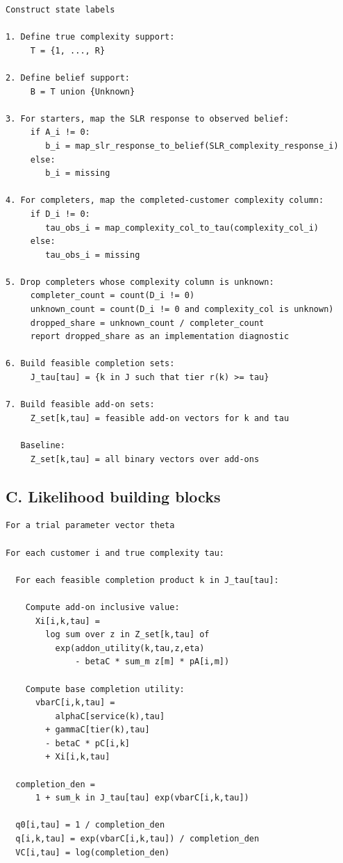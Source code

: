 \documentclass[11pt]{article}
\begin{document}
\begin{Verbatim}[fontsize=\small, frame=single]
Construct state labels

1. Define true complexity support:
     T = {1, ..., R}

2. Define belief support:
     B = T union {Unknown}

3. For starters, map the SLR response to observed belief:
     if A_i != 0:
        b_i = map_slr_response_to_belief(SLR_complexity_response_i)
     else:
        b_i = missing

4. For completers, map the completed-customer complexity column:
     if D_i != 0:
        tau_obs_i = map_complexity_col_to_tau(complexity_col_i)
     else:
        tau_obs_i = missing

5. Drop completers whose complexity column is unknown:
     completer_count = count(D_i != 0)
     unknown_count = count(D_i != 0 and complexity_col is unknown)
     dropped_share = unknown_count / completer_count
     report dropped_share as an implementation diagnostic

6. Build feasible completion sets:
     J_tau[tau] = {k in J such that tier r(k) >= tau}

7. Build feasible add-on sets:
     Z_set[k,tau] = feasible add-on vectors for k and tau

   Baseline:
     Z_set[k,tau] = all binary vectors over add-ons
\end{Verbatim}

\newpage
\subsection*{C. Likelihood building blocks}

\begin{Verbatim}[fontsize=\small, frame=single]
For a trial parameter vector theta

For each customer i and true complexity tau:

  For each feasible completion product k in J_tau[tau]:

    Compute add-on inclusive value:
      Xi[i,k,tau] =
        log sum over z in Z_set[k,tau] of
          exp(addon_utility(k,tau,z,eta)
              - betaC * sum_m z[m] * pA[i,m])

    Compute base completion utility:
      vbarC[i,k,tau] =
          alphaC[service(k),tau]
        + gammaC[tier(k),tau]
        - betaC * pC[i,k]
        + Xi[i,k,tau]

  completion_den =
      1 + sum_k in J_tau[tau] exp(vbarC[i,k,tau])

  q0[i,tau] = 1 / completion_den
  q[i,k,tau] = exp(vbarC[i,k,tau]) / completion_den
  VC[i,tau] = log(completion_den)
\end{Verbatim}
\end{document}
